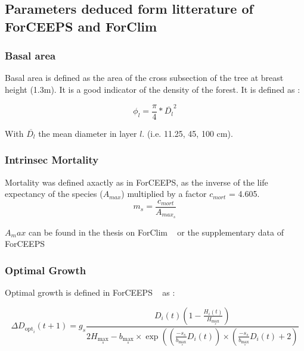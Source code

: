 \documentclass{article}
\begin{document}
\subsection{Parameters deduced form litterature of ForCEEPS and ForClim}

\subsubsection{Basal area}

Basal area is defined as the area of the cross subsection of the tree at breast height (1.3m). It is a good indicator of the density of the forest. It is defined as : 

\begin{equation}
    \phi_{l} = \frac{\pi}{4} * \overline{D_{l}}^2
\end{equation}

With $\overline{D_{l}}$ the mean diameter in layer $l$. (i.e. 11.25, 45, 100 cm).\\

\subsubsection{Intrinsec Mortality}

Mortality was defined axactly as in ForCEEPS, as the inverse of the life expectancy of the species ($A_{max}$) multiplied by a factor $c_{mort}$ = 4.605.
\begin{equation}
    m_s = \frac{c_{mort}}{A_{max_s}}
\end{equation}

$A_max$ can be found in the thesis on ForClim ~\autocite{bugmannEcologyMountainousForests1965} or the supplementary data of ForCEEPS ~\autocite{morinForestSuccessionGap2021}

\subsubsection{Optimal Growth}

Optimal growth is defined in ForCEEPS ~\autocite{morinForestSuccessionGap2021} as :

\begin{equation}
    \Delta D_{\mathrm{opt}_i}(t+1)=g_s \frac{D_i(t)\left(1-\frac{H_i(t)}{H_{\max _s}}\right)}{2 H_{\max _s}-b_{\max _s} \times \exp \left(\left(\frac{-s_s}{b_{\max _s}} D_i(t)\right) \times\left(\frac{-s_s}{b_{\max _s}} D_i(t)+2\right)\right.}
\end{equation}
\end{document}

